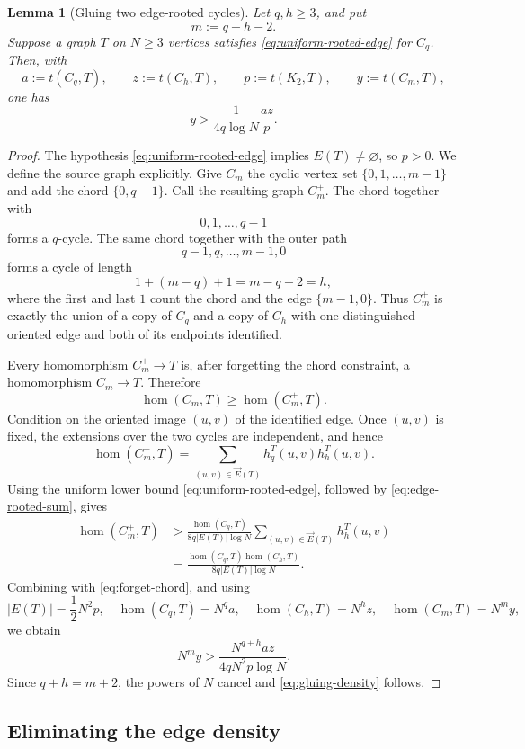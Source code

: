 \documentclass[11pt]{article}
\newtheorem{lemma}[theorem]{Lemma}
\newcommand{\homn}{\operatorname{hom}}
\newcommand{\1}{\mathbf{1}}
\begin{document}
\begin{lemma}[Gluing two edge-rooted cycles]
\label{lem:cycle-gluing}
Let $q,h\ge3$, and put
\[
  m:=q+h-2.
\]
Suppose a graph $T$ on $N\ge3$ vertices satisfies
\eqref{eq:uniform-rooted-edge} for $C_q$.  Then, with
\[
  a:=t(C_q,T),
  \qquad
  z:=t(C_h,T),
  \qquad
  p:=t(K_2,T),
  \qquad
  y:=t(C_m,T),
\]
one has
\[
  y>\frac{1}{4q\log N}\frac{az}{p}.
  \tag{7.12}\label{eq:gluing-density}
\]
\end{lemma}

\begin{proof}
The hypothesis \eqref{eq:uniform-rooted-edge} implies $E(T)\ne\varnothing$, so
$p>0$.  We define the source graph explicitly.  Give $C_m$ the cyclic vertex set
$\{0,1,\ldots,m-1\}$ and add the chord $\{0,q-1\}$.  Call the resulting graph
$C_m^+$.  The chord together with
\[
  0,1,\ldots,q-1
\]
forms a $q$-cycle.  The same chord together with the outer path
\[
  q-1,q,\ldots,m-1,0
\]
forms a cycle of length
\[
  1+(m-q)+1=m-q+2=h,
\]
where the first and last $1$ count the chord and the edge $\{m-1,0\}$.
Thus $C_m^+$ is exactly the union of a copy of $C_q$ and a copy of $C_h$
with one distinguished oriented edge and both of its endpoints identified.

Every homomorphism $C_m^+\to T$ is, after forgetting the chord constraint, a
homomorphism $C_m\to T$.  Therefore
\[
  \homn(C_m,T)\ge\homn(C_m^+,T).
  \tag{7.13}\label{eq:forget-chord}
\]
Condition on the oriented image $(u,v)$ of the identified edge.  Once $(u,v)$
is fixed, the extensions over the two cycles are independent, and hence
\[
  \homn(C_m^+,T)
  =
  \sum_{(u,v)\in\vec E(T)}h_q^T(u,v)h_h^T(u,v).
  \tag{7.14}\label{eq:gluing-exact}
\]
Using the uniform lower bound \eqref{eq:uniform-rooted-edge}, followed by
\eqref{eq:edge-rooted-sum}, gives
\[
\begin{aligned}
  \homn(C_m^+,T)
  &>
  \frac{\homn(C_q,T)}{8q|E(T)|\log N}
  \sum_{(u,v)\in\vec E(T)}h_h^T(u,v)\\
  &=
  \frac{\homn(C_q,T)\homn(C_h,T)}
       {8q|E(T)|\log N}.
\end{aligned}
\]
Combining with \eqref{eq:forget-chord}, and using
\[
  |E(T)|=\frac12N^2p,
  \quad
  \homn(C_q,T)=N^q a,
  \quad
  \homn(C_h,T)=N^h z,
  \quad
  \homn(C_m,T)=N^m y,
\]
we obtain
\[
  N^my
  >
  \frac{N^{q+h}az}{4qN^2p\log N}.
\]
Since $q+h=m+2$, the powers of $N$ cancel and
\eqref{eq:gluing-density} follows.
\end{proof}

\subsection{Eliminating the edge density}
\end{document}
